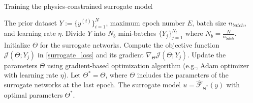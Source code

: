 \begin{algorithm}[H]
	\caption{Training the physics-constrained surrogate model}
	\label{alg_surrogate}
	\begin{algorithmic}[1]
		\Require The prior dataset $Y:=\{y^{(i)}\}_{i=1}^N$, maximum epoch number $E$, batch size $n_{batch}$, and learning rate $\eta$.
            \State Divide $Y$ into $N_b$ mini-batches $\{Y_j\}_{j=1}^{N_b}$ where $N_b=\frac{N}{n_{batch}}$.
            \State Initialize $\Theta$ for the surrogate networks.
            \State Compute the objective function $\mathcal{J}(\Theta; Y_j)$ in  \eqref{surrogate_loss} and its gradient $\nabla_{\Theta}\mathcal{J}(\Theta; Y_j)$.
		\State Update the parameters $\Theta$ using gradient-based optimization algorithm (e.g., Adam optimizer \cite{kingma2014adam} with learning rate $\eta$).
		\EndFor
		\EndFor
  \State Let $\Theta^*=\Theta$, where $\Theta$ includes the parameters of the surrogate networks at the last epoch.
		\Ensure The surrogate model $u=\hat{\mathcal{F}}_{\Theta^*}(y)$ with optimal parameters $\Theta^*$.
	\end{algorithmic}
\end{algorithm}
